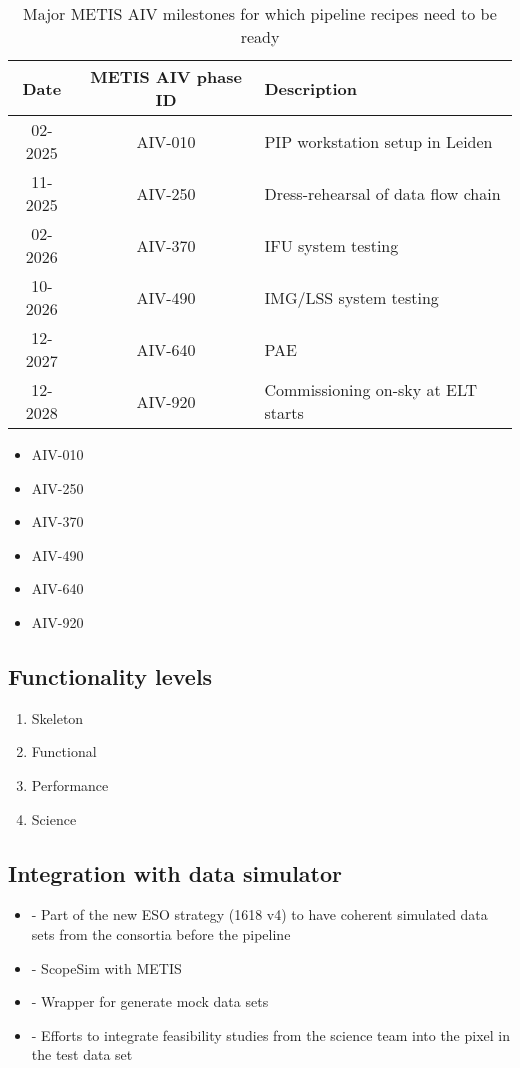 \documentclass[a4paper]{spie}  %
\begin{document}
\begin{table}[]
    \centering
\caption{Major METIS AIV milestones for which pipeline recipes need to be ready}
\label{tab:dev_aiv_milestones}
    \begin{tabular}{c|c|l}
    \hline
    \hline
         Date &   METIS AIV phase ID & Description\\
         \hline
         02-2025 &   AIV-010&PIP workstation setup in Leiden\\
         11-2025 &   AIV-250&Dress-rehearsal of data flow chain\\
 02-2026 & AIV-370&IFU system testing\\
 10-2026 &  AIV-490&IMG/LSS system testing\\
 12-2027 & AIV-640&PAE\\
 12-2028 & AIV-920&Commissioning on-sky at ELT starts\\
 \hline
 \end{tabular}
      
\end{table}

\begin{itemize}
    \item AIV-010
    \item AIV-250
    \item AIV-370
    \item AIV-490
    \item AIV-640
    \item AIV-920
\end{itemize}



\subsection{Functionality levels}
\label{ssec:dev_levels}
  
 \begin{enumerate}
     \item Skeleton
     \item Functional
     \item Performance
     \item Science
 \end{enumerate}

\subsection{Integration with data simulator}
\label{ssec:dev_scopesim}

 \begin{itemize}
     \item - Part of the new ESO strategy (1618 v4) to have coherent simulated data sets from the consortia before the pipeline
     \item - ScopeSim with METIS
     \item - Wrapper for generate mock data sets
     \item - Efforts to integrate feasibility studies from the science team into the pixel in the test data set
 \end{itemize}
\end{document}
